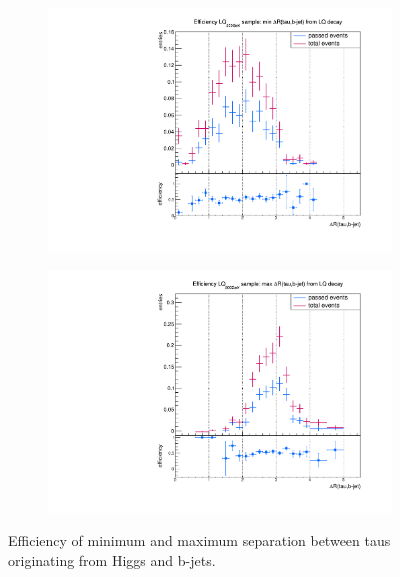 \begin{figure}
\begin{subfigure}[t]{0.49\textwidth}
                \label{dRFromLQ:signal:taubjet:maxLQ75}
                \end{subfigure}
                \begin{subfigure}[t]{0.49\textwidth}
                \includegraphics[width=\textwidth]{figures/plots/LQ76/Divided_mindR_fromLQ_taubjet.pdf}
                \label{dRFromLQ:signaltaubjet:minLQ76}
                \end{subfigure}
                \begin{subfigure}[t]{0.49\textwidth}
                \includegraphics[width=\textwidth]{figures/plots/LQ76/Divided_maxdR_fromLQ_taubjet.pdf}
                \label{dRFromLQ:signal:taubjet:maxLQ76}
                \end{subfigure}
\caption[Efficiency of separation between taus originating from Higgs and b-jets.]{Efficiency of minimum and maximum separation between taus originating from Higgs and b-jets.}
\label{dRFromLQ:signal:taubjet}
\end{figure}
%
